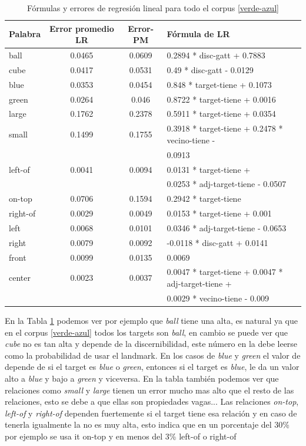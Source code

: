 \begin{table}[h!]
\begin{center}
\caption{F\'ormulas y errores de regresi\'on lineal para todo el corpus \ref{verde-azul}}
\label{tabla-linear-regresion-all}
\begin{tabular}{|l|c|c|l|}
\hline
Palabra &Error promedio	LR	& Error-PM	& F\'ormula de LR\\
\hline
ball		 &0.0465   &0.0609	  & 0.2894 * disc-gatt + 0.7883\\
\hline
cube		 &0.0417	 &0.0531	  &0.49   * disc-gatt - 0.0129\\
\hline
\hline
blue		 &0.0353	 &0.0454	  &0.848  * target-tiene + 0.1073\\
\hline
green		 &0.0264	 &0.046	    &0.8722 * target-tiene + 0.0016\\
\hline
\hline
large		 &0.1762	 &0.2378	  &0.5911 * target-tiene + 0.0354\\
\hline
small		 &0.1499	 &0.1755	  &0.3918 * target-tiene + 0.2478 * vecino-tiene -\\
				 &				 &					&0.0913\\
\hline
\hline
left-of  &0.0041	 &0.0094	  &0.0131 * target-tiene +\\
				 &				 &					&0.0253 * adj-target-tiene - 0.0507\\
\hline
on-top	 &0.0706	 &0.1594	  &0.2942 * target-tiene \\
\hline
right-of &0.0029	 &0.0049	  &0.0153 * target-tiene + 0.001\\
\hline
\hline
left		 &0.0068	 &0.0101	  &0.0346 * adj-target-tiene - 0.0653\\
\hline
right		 &0.0079	 &0.0092	  &-0.0118 * disc-gatt + 0.0141\\
\hline
front    &0.0099 	 &0.0135		& 0.0069\\
\hline
center	 &0.0023	 &0.0037	  &0.0047 * target-tiene + 0.0047 * adj-target-tiene +\\
				 &				 &					&0.0029 * vecino-tiene - 0.009\\
\hline
\end{tabular}
\end{center}
\end{table}

En la Tabla \ref{tabla-linear-regresion-all} podemos ver por ejemplo que {\it ball} tiene una \puse alta, es natural ya que en el corpus \ref{verde-azul} todos los targets son {\it ball}, en cambio se puede ver que {\it cube} no es tan alta y depende de la discernibilidad, este n\'umero en la \puse debe leerse como la probabilidad de usar el landmark. En los casos de {\it blue} y {\it green} el valor de \puse depende de si el target es {\it blue} o {\it green}, entonces si el target es {\it blue}, le da un valor alto a {\it blue} y bajo a {\it green} y viceversa.
En la tabla tambi\'en podemos ver que relaciones como {\it small} y {\it large} tienen un error mucho mas alto que el resto de las relaciones, esto se debe a que ellas son propiedades vagas... 
Las relaciones {\it on-top}, {\it left-of} y {\it right-of} dependen fuertemente si el target tiene esa relaci\'on y en caso de tenerla igualmente la \puse no es muy alta, esto indica que en un porcentaje del 30\% por ejemplo se usa {it on-top} y en menos del 3\% left-of o right-of

